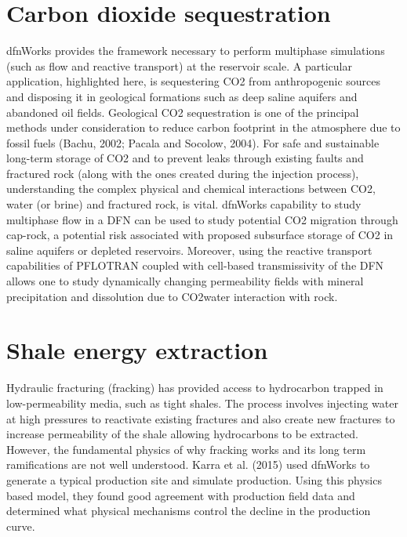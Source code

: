 \documentclass[letterpaper,10pt,english]{sphinxmanual}
\begin{document}
\section{Carbon dioxide sequestration}
\label{\detokenize{applications:carbon-dioxide-sequestration}}
dfnWorks provides the framework necessary to perform multiphase simulations (such as flow and reactive transport) at the reservoir scale. A particular application, highlighted here, is sequestering CO2 from anthropogenic sources and disposing it in geological formations such as deep saline aquifers and abandoned oil fields. Geological CO2 sequestration is one of the principal methods under consideration to reduce carbon footprint in the atmosphere due to fossil fuels (Bachu, 2002; Pacala and Socolow, 2004). For safe and sustainable long-term storage of CO2 and to prevent leaks through existing faults and fractured rock (along with the ones created during the injection process), understanding the complex physical and chemical interactions between CO2, water (or brine) and fractured rock, is vital. dfnWorks capability to study multiphase flow in a DFN can be used to study potential CO2 migration through cap-rock, a potential risk associated with proposed subsurface storage of CO2 in saline aquifers or depleted reservoirs. Moreover, using the reactive transport capabilities of PFLOTRAN coupled with cell-based transmissivity of the DFN allows one to study dynamically changing permeability fields with mineral precipitation and dissolution due to CO2\textendash{}water interaction with rock.


\section{Shale energy extraction}
\label{\detokenize{applications:shale-energy-extraction}}
Hydraulic fracturing (fracking) has provided access to hydrocarbon trapped in low-permeability media, such as tight shales. The process involves injecting water at high pressures to reactivate existing fractures and also create new fractures to increase permeability of the shale allowing hydrocarbons to be extracted. However, the fundamental physics of why fracking works and its long term ramifications are not well understood. Karra et al. (2015) used dfnWorks to generate a typical production site and simulate production. Using this physics based model, they found good agreement with production field data and determined what physical mechanisms control the decline in the production curve.
\end{document}
